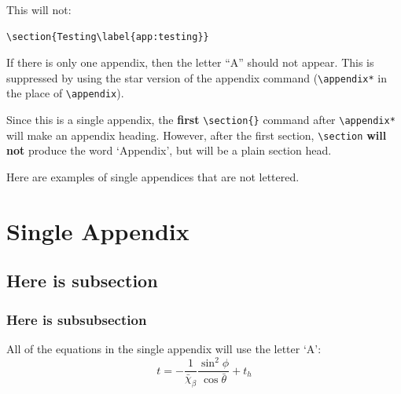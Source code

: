 \documentclass[reprint]{JASA}
\begin{document}
This will not:
\begin{verbatim}
\section{Testing\label{app:testing}}
\end{verbatim}


If there is only one appendix, then the letter ``A'' should not
appear. This is suppressed by using the star version of the appendix
command (\verb+\appendix*+ in the place of \verb+\appendix+).

Since this is a single appendix, the {\bf first} \verb+\section{}+ command 
after \verb+\appendix*+ will make an appendix heading. 
However, after the first section, \verb+\section+ 
{\bf will not} produce the word `Appendix', but will
be a plain section head.

Here are examples of single appendices that are not lettered.


\appendix*


\section{Single Appendix}
\subsection{Here is subsection}
\subsubsection{Here is subsubsection}

All of the equations in the single appendix will use the letter `A':
\begin{equation}
t=-\frac{1}{\bar{\chi}_\beta}\frac{\sin^2\phi}{\cos\bar\theta}+t_h
\end{equation}

\newpage


\end{document}
